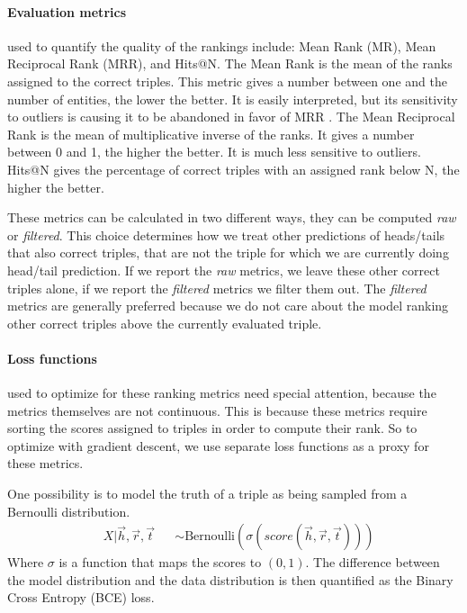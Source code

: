\paragraph{Evaluation metrics} used to quantify the quality of the rankings include: Mean Rank (MR), Mean Reciprocal Rank (MRR), and Hits@N.
The Mean Rank is the mean of the ranks assigned to the correct triples. This metric gives a number between one and the number of entities, the lower the better.
It is easily interpreted, but its sensitivity to outliers is causing it to be abandoned in favor of MRR .
The Mean Reciprocal Rank is the mean of multiplicative inverse of the ranks. It gives a number between 0 and 1, the higher the better. It is much less sensitive to outliers.
Hits@N gives the percentage of correct triples with an assigned rank below N, the higher the better.

These metrics can be calculated in two different ways, they can be computed \textit{raw} or \textit{filtered}. This choice determines how we treat other predictions of heads/tails that also correct triples, that are not the triple for which we are currently doing head/tail prediction. If we report the \textit{raw} metrics, we leave these other correct triples alone, if we report the \textit{filtered} metrics we filter them out. The \textit{filtered} metrics are generally preferred because we do not care about the model ranking other correct triples above the currently evaluated triple.

\paragraph{Loss functions} used to optimize for these ranking metrics need special attention, because the metrics themselves are not continuous. This is because these metrics require sorting the scores assigned to triples in order to compute their rank. So to optimize with gradient descent, we use separate loss functions as a proxy for these metrics. 

One possibility is to model the truth of a triple as being sampled from a Bernoulli distribution.  
\begin{align}
    & X | \vec{h}, \vec{r}, \vec{t}
&& \sim \text{Bernoulli}( \sigma( score( \vec{h}, \vec{r}, \vec{t} ) ) )
\end{align}
Where $\sigma$ is a function that maps the scores to $(0,1)$.
The difference between the model distribution and the data distribution is then quantified as the Binary Cross Entropy (BCE) loss.

